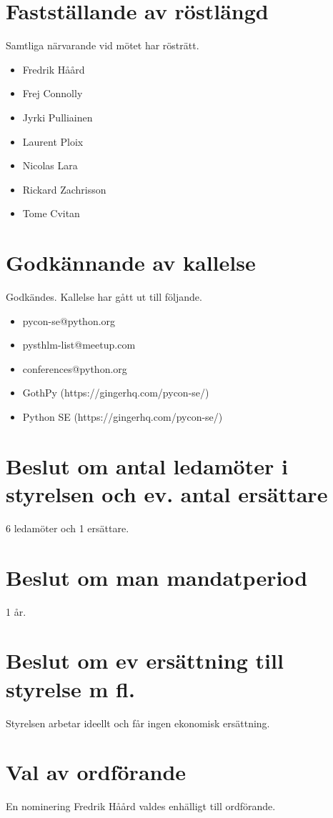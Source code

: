 \documentclass[11pt, a4paper]{article}
\begin{document}
\section{Fastställande av röstlängd}
Samtliga närvarande vid mötet har rösträtt.

\begin{itemize}
    \item Fredrik Håård
    \item Frej Connolly
    \item Jyrki Pulliainen
    \item Laurent Ploix
    \item Nicolas Lara
    \item Rickard Zachrisson
    \item Tome Cvitan
\end{itemize}

\section{Godkännande av kallelse}
Godkändes. Kallelse har gått ut till följande.

\begin{itemize}
    \item pycon-se@python.org
    \item pysthlm-list@meetup.com
    \item conferences@python.org
    \item GothPy (https://gingerhq.com/pycon-se/)
    \item Python SE (https://gingerhq.com/pycon-se/)
\end{itemize}

\section{Beslut om antal ledamöter i styrelsen och ev. antal ersättare}
6 ledamöter och 1 ersättare.

\section{Beslut om man mandatperiod}
1 år.

\section{Beslut om ev ersättning till styrelse m fl.}
Styrelsen arbetar ideellt och får ingen ekonomisk ersättning.

\section{Val av ordförande}
En nominering Fredrik Håård valdes enhälligt till ordförande.
\end{document}
